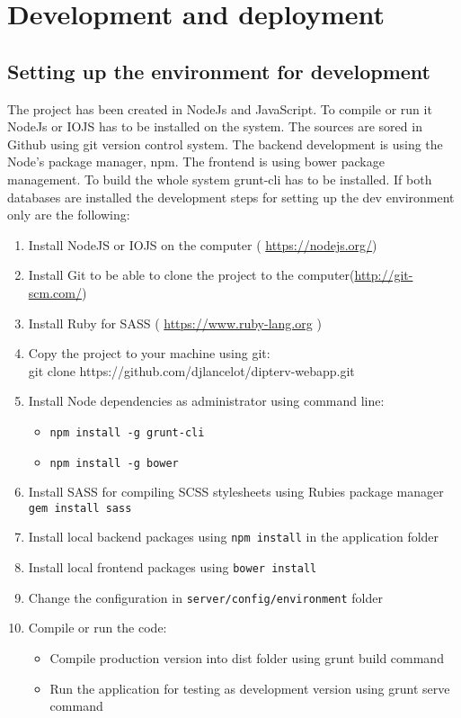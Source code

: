 \appendix
\chapter{Development and deployment}
\section*{Setting up the environment for development}
The project has been created in NodeJs and JavaScript. To compile or run it NodeJs or IOJS has to be installed on the system. The sources are sored in Github using git version control system. The backend development is using the Node's package manager, npm. The frontend is using bower package management. To build the whole system grunt-cli has to be installed. If both databases are installed the development steps for setting up the dev environment only are the following:
\begin{enumerate}
\item Install NodeJS or IOJS on the computer ( \url{https://nodejs.org/})
\item Install Git to be able to clone the project to the computer(\url{http://git-scm.com/})
\item Install Ruby for SASS ( \url{https://www.ruby-lang.org} )
\item Copy the project to your machine using git: \\
git clone https://github.com/djlancelot/dipterv-webapp.git
\item Install Node dependencies as administrator using command line: 
\begin{itemize}
\item \texttt{npm install -g grunt-cli}
\item \texttt{npm install -g bower}
\end{itemize}
\item Install SASS for compiling SCSS stylesheets using Rubies package manager \texttt{gem install sass}
\item Install local backend packages using \texttt{npm install} in the application folder
\item Install local frontend packages using \texttt{bower install}
\item Change the configuration in \texttt{server/config/environment} folder
\item Compile or run the code:
\begin{itemize}
\item Compile production version into dist folder using grunt build command
\item Run the application for testing as development version using grunt serve command
\end{itemize}
\end{enumerate}
